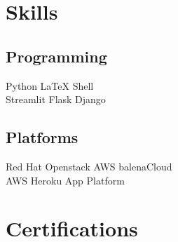 \documentclass[letterpaper,dvipsnames]{deedy-resume} %
\begin{document}
\begin{minipage}[t]{0.33\textwidth}




\section{Skills}

\subsection{Programming}

Python \textbullet{} \LaTeX \textbullet{}  Shell \ \\ 

Streamlit \textbullet{} Flask \textbullet{} Django\\

\subsection{Platforms}

Red Hat Openstack \textbullet{} AWS \textbullet{} balenaCloud \\ 
AWS \textbullet{} Heroku App Platform \\

\sectionspace %




\section{Certifications}


\end{minipage}
\end{document}
